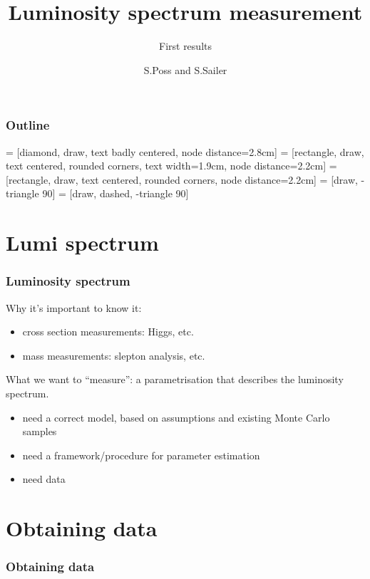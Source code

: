 \documentclass[handout]{beamer}
\author{S.Poss and S.Sailer}
\title{Luminosity spectrum measurement}
\subtitle{First results}
\begin{document}
\begin{frame}
\titlepage
\end{frame}
\begin{frame}
\frametitle{Outline}
\tableofcontents
\end{frame}
 = [diamond, draw, text badly centered, node distance=2.8cm]
 = [rectangle, draw, text centered, rounded corners, text width=1.9cm, node distance=2.2cm]
 = [rectangle, draw, text centered, rounded corners, node distance=2.2cm]
 = [draw, -triangle 90]
 = [draw, dashed, -triangle 90]
\section{Lumi spectrum}
\begin{frame}
\frametitle{Luminosity spectrum}
Why it's important to know it:
\begin{itemize}
\item cross section measurements: Higgs, etc.
\item mass measurements: slepton analysis, etc.
\end{itemize}
What we want to ``measure'': a parametrisation that describes the luminosity
spectrum.
\begin{itemize}
\item need a correct model, based on assumptions and existing Monte Carlo
samples
\item need a framework/procedure for parameter estimation
\item need data 
\end{itemize}
\end{frame}
\section{Obtaining data}
\begin{frame}
\frametitle{Obtaining data}
\begin{figure}[h]
\end{figure}
\end{frame}
\end{document}
